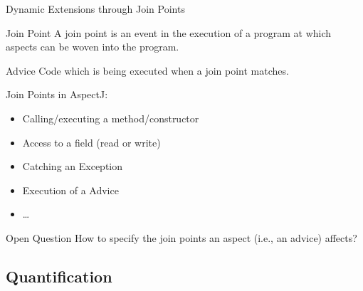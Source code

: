 \begin{frame}{Dynamic Extensions through Join Points}
	\begin{fancycolumns}[animation=none]
		\begin{definition}{Join Point }
			A join point is an event in the execution of a program at which aspects can be woven into the program.
		\end{definition}
		\begin{definition}{Advice}
			Code which is being executed when a join point matches. 
		\end{definition}
		\begin{definition}{Join Points in AspectJ:}
			\begin{itemize}
				\item Calling/executing a method/constructor
				\item Access to a field (read or write)
				\item Catching an Exception
				\item Execution of a Advice
				\item \ldots
			\end{itemize}
		\end{definition}
	\nextcolumn
		\begin{exampletight}{}
			\centering
		\end{exampletight}
		\pause
		\begin{note}{Open Question}		
			How to specify the join points an aspect (i.e., an advice) affects?
		\end{note}
	\end{fancycolumns}
\end{frame}

\subsection{Quantification}

